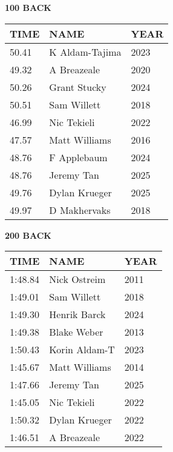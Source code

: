 \begin{minipage}[t]{0.48\textwidth}
\centering
\textbf{100 BACK}\\[0.05cm]
\begin{tabular}{@{}p{1.8cm}p{2.8cm}p{1.2cm}@{}}
\hline
\textbf{TIME} & \textbf{NAME} & \textbf{YEAR} \\
\hline
50.41 & K Aldam-Tajima & 2023 \\
49.32 & A Breazeale & 2020 \\
50.26 & Grant Stucky & 2024 \\
50.51 & Sam Willett & 2018 \\
46.99 & Nic Tekieli & 2022 \\
47.57 & Matt Williams & 2016 \\
48.76 & F Applebaum & 2024 \\
48.76 & Jeremy Tan & 2025 \\
49.76 & Dylan Krueger & 2025 \\
49.97 & D Makhervaks & 2018 \\
\hline
\end{tabular}
\end{minipage}\hfill
\begin{minipage}[t]{0.48\textwidth}
\centering
\textbf{200 BACK}\\[0.05cm]
\begin{tabular}{@{}p{1.8cm}p{2.8cm}p{1.2cm}@{}}
\hline
\textbf{TIME} & \textbf{NAME} & \textbf{YEAR} \\
\hline
1:48.84 & Nick Ostreim & 2011 \\
1:49.01 & Sam Willett & 2018 \\
1:49.30 & Henrik Barck & 2024 \\
1:49.38 & Blake Weber & 2013 \\
1:50.43 & Korin Aldam-T & 2023 \\
1:45.67 & Matt Williams & 2014 \\
1:47.66 & Jeremy Tan & 2025 \\
1:45.05 & Nic Tekieli & 2022 \\
1:50.32 & Dylan Krueger & 2022 \\
1:46.51 & A Breazeale & 2022 \\
\hline
\end{tabular}
\end{minipage}

\vspace{0.4cm}

